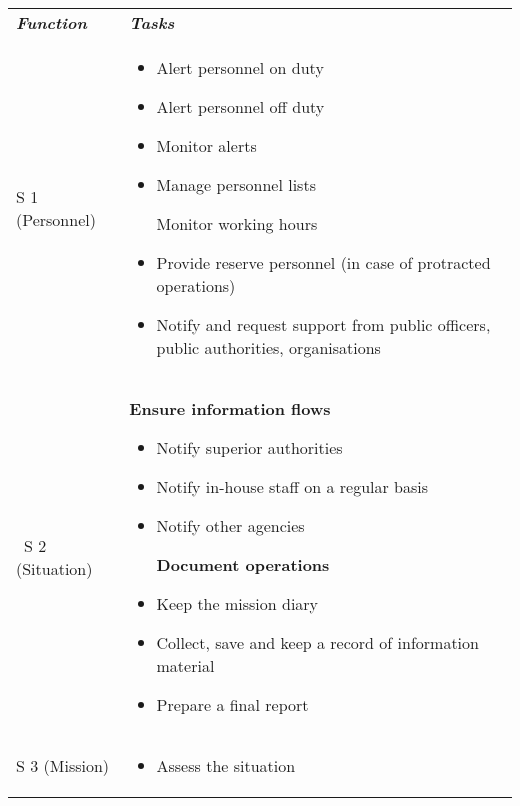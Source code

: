 \documentclass{article}
\begin{document}
\begin{tabu} to \textwidth { |X|X| }
\hline



\emph{\textbf{Function}} & \emph{\textbf{Tasks}}
 \\


S 1 (Personnel)
 & 
\begin{itemize}
\item Alert personnel on duty


\item Alert personnel off duty


\item Monitor alerts


\item Manage personnel lists

Monitor working hours


\item Provide reserve personnel (in case of protracted operations)


\item Notify and request support from public officers, public authorities, organisations


\end{itemize} \\


 S 2 (Situation) & \textbf{Ensure information flows}

\begin{itemize}
\item Notify superior authorities


\item Notify in-house staff on a regular basis


\item Notify other agencies

\textbf{Document operations}


\item Keep the mission diary


\item Collect, save and keep a record of information material


\item Prepare a final report


\end{itemize} \\


S 3 (Mission)
 & 
\begin{itemize}
\item Assess the situation



\end{itemize}
\end{tabu}
\end{document}
